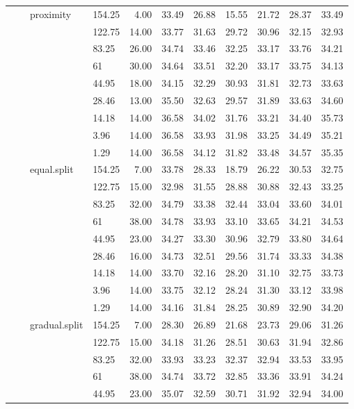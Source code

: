 \begin{longtable}{llllrrrrrrr}
   &  & proximity & 154.25 & 4.00 & 33.49 & 26.88 & 15.55 & 21.72 & 28.37 & 33.49 \\ 
   &  &  & 122.75 & 14.00 & 33.77 & 31.63 & 29.72 & 30.96 & 32.15 & 32.93 \\ 
   &  &  & 83.25 & 26.00 & 34.74 & 33.46 & 32.25 & 33.17 & 33.76 & 34.21 \\ 
   &  &  & 61 & 30.00 & 34.64 & 33.51 & 32.20 & 33.17 & 33.75 & 34.13 \\ 
   &  &  & 44.95 & 18.00 & 34.15 & 32.29 & 30.93 & 31.81 & 32.73 & 33.63 \\ 
   &  &  & 28.46 & 13.00 & 35.50 & 32.63 & 29.57 & 31.89 & 33.63 & 34.60 \\ 
   &  &  & 14.18 & 14.00 & 36.58 & 34.02 & 31.76 & 33.21 & 34.40 & 35.73 \\ 
   &  &  & 3.96 & 14.00 & 36.58 & 33.93 & 31.98 & 33.25 & 34.49 & 35.21 \\ 
   &  &  & 1.29 & 14.00 & 36.58 & 34.12 & 31.82 & 33.48 & 34.57 & 35.35 \\ 
   &  & equal.split & 154.25 & 7.00 & 33.78 & 28.33 & 18.79 & 26.22 & 30.53 & 32.75 \\ 
   &  &  & 122.75 & 15.00 & 32.98 & 31.55 & 28.88 & 30.88 & 32.43 & 33.25 \\ 
   &  &  & 83.25 & 32.00 & 34.79 & 33.38 & 32.44 & 33.04 & 33.60 & 34.01 \\ 
   &  &  & 61 & 38.00 & 34.78 & 33.93 & 33.10 & 33.65 & 34.21 & 34.53 \\ 
   &  &  & 44.95 & 23.00 & 34.27 & 33.30 & 30.96 & 32.79 & 33.80 & 34.64 \\ 
   &  &  & 28.46 & 16.00 & 34.73 & 32.51 & 29.56 & 31.74 & 33.33 & 34.38 \\ 
   &  &  & 14.18 & 14.00 & 33.70 & 32.16 & 28.20 & 31.10 & 32.75 & 33.73 \\ 
   &  &  & 3.96 & 14.00 & 33.75 & 32.12 & 28.24 & 31.30 & 33.12 & 33.98 \\ 
   &  &  & 1.29 & 14.00 & 34.16 & 31.84 & 28.25 & 30.89 & 32.90 & 34.20 \\ 
   &  & gradual.split & 154.25 & 7.00 & 28.30 & 26.89 & 21.68 & 23.73 & 29.06 & 31.26 \\ 
   &  &  & 122.75 & 15.00 & 34.18 & 31.26 & 28.51 & 30.63 & 31.94 & 32.86 \\ 
   &  &  & 83.25 & 32.00 & 33.93 & 33.23 & 32.37 & 32.94 & 33.53 & 33.95 \\ 
   &  &  & 61 & 38.00 & 34.74 & 33.72 & 32.85 & 33.36 & 33.91 & 34.24 \\ 
   &  &  & 44.95 & 23.00 & 35.07 & 32.59 & 30.71 & 31.92 & 32.94 & 34.00 \\ 

\end{longtable}
